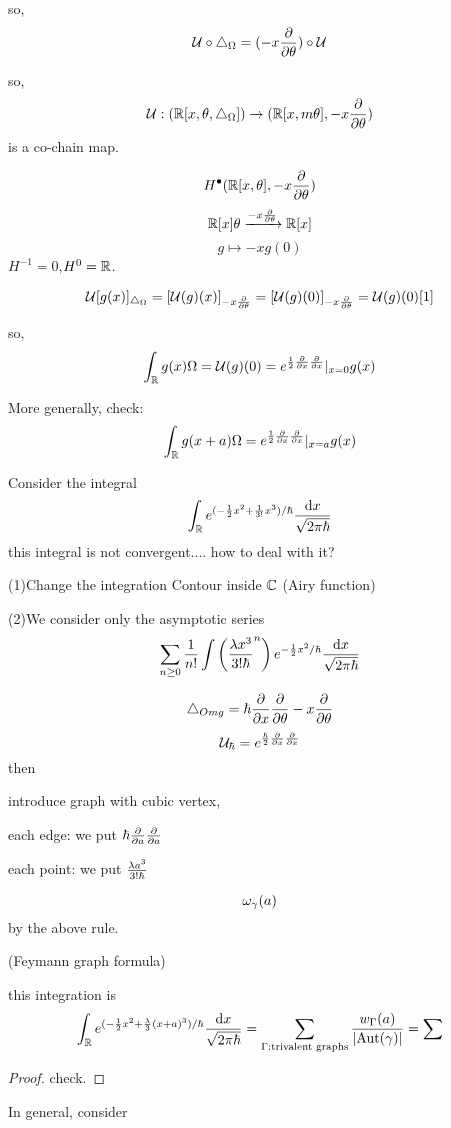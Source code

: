 so,
$$\mathcal{U}\circ\triangle_{\Omega}=(-x\frac{\partial } {\partial \theta})\circ\mathcal{U}$$

so,
$$\mathcal{U}:(\mathbb{R}[x,\theta,\triangle_{\Omega}])\to
(\mathbb{R}[x,m\theta],-x\frac{\partial } {\partial \theta})$$
is a co-chain map.

$$H^{\bullet}(\mathbb{R}[x,\theta],-x\frac{\partial } {\partial \theta})$$
$$\mathbb{R}[x]\theta\xrightarrow{-x\frac{\partial } {\partial \theta}}\mathbb{R}[x]$$
$$g\mapsto -xg(0)$$
$H^{-1}=0$,$H^0=\mathbb{R}$.

$$\mathcal{U}[g(x)]_{\triangle_{\Omega}}=[\mathcal{U}(g)(x)]_{-x\frac{\partial } {\partial \theta}}
=[\mathcal{U}(g)(0)]_{-x\frac{\partial } {\partial \theta}}
=\mathcal{U}(g)(0)[1]$$

so, 
$$\int_{\mathbb{R}}g(x)\Omega=\mathcal{U}(g)(0)=
e^{\frac{1}{2}\frac{\partial } {\partial x}\frac{\partial } {\partial x}}|_{x=0}g(x)$$

More generally, check:
$$\int_{\mathbb{R}}g(x+a)\Omega=
e^{\frac{1}{2}\frac{\partial } {\partial x}\frac{\partial } {\partial x}}|_{x=a}g(x)$$


\begin{example}
Consider the integral 
$$
  \int_{\mathbb{R}}
    e^{(-\frac{1}{2}x^2+\frac{1}{3!}x^3)/\hbar}
    \frac{\mathrm{d} x}{\sqrt{2\pi\hbar}}
$$
this integral is not convergent.... how to deal with it?

(1)Change the integration Contour inside $\mathbb{C}$
(Airy function)

(2)We consider only the asymptotic series
$$
  \sum_{n\geq 0}\frac{1}{n!}
    \int
      \left(
        \frac{\lambda x^3}{3!\hbar}^n
      \right)
      e^{-\frac{1}{2}x^2/\hbar}
      \frac{\mathrm{d} x}{\sqrt{2\pi\hbar}}
$$

$$\triangle_{Omg}=\hbar\frac{\partial } {\partial x}\frac{\partial } {\partial \theta}-x\frac{\partial } {\partial \theta}$$
$$\mathcal{U}_{\hbar}=e^{\frac{\hbar}{2}\frac{\partial } {\partial x}\frac{\partial } {\partial x}}$$
then

introduce graph with cubic vertex, 

each edge: we put $\hbar\frac{\partial } {\partial a}\frac{\partial } {\partial a}$

each point: we put $\frac{\lambda a^3}{3!\hbar}$

$$\omega_{\gamma}(a)$$
by the above rule.

\end{example}

\begin{thm}(Feymann graph formula)

this integration is
$$
   \int_{\mathbb{R}}
     e^{(-\frac{1}{2}x^2+\frac{\lambda}{3}(x+a)^3)/\hbar}
     \frac{\mathrm{d} x}{\sqrt{2\pi\hbar}}
=
   \sum_{\Gamma:\text{trivalent graphs}}
     \frac{w_{\Gamma}(a)}
          {|\text{Aut}(\gamma)|}
=
   \sum
$$
\end{thm}
\begin{proof}
check.
\end{proof}

In general, consider









